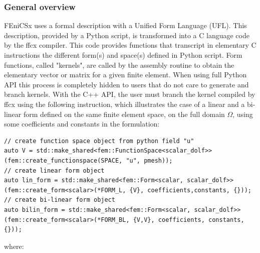 \documentclass[12pt]{article}
\newcommand{\f}[1]{FEniCSx#1}
\begin{document}
\subsubsection{General overview\label{gen_over}}
\f{} uses a formal description with a Unified Form Language (UFL). This description, provided by a Python script, is transformed into a C language code by the ffcx compiler. This code provides functions that transcript in elementary C instructions  the different form(s) and space(s) defined in Python script. Form functions, called "kernels",  are called by the assembly routine to obtain the elementary vector or matrix for a given finite element. When using full Python API this process is completely hidden to users that do not care to generate and branch kernels. With the C++ API, the user must branch the kernel compiled by ffcx using the following instruction, which illustrates the case of a linear and a bi-linear form defined on the same finite element space, on the full domain $\Omega$, using some coefficients and constants in the formulation:
\begin{lstlisting}[numbers=none,basicstyle=\scriptsize,label=generalfenicsxform]
// create function space object from python field "u"
auto V = std::make_shared<fem::FunctionSpace<scalar_dolf>>(fem::create_functionspace(SPACE, "u", pmesh));
// create linear form object
auto lin_form = std::make_shared<fem::Form<scalar, scalar_dolf>>(fem::create_form<scalar>(*FORM_L, {V}, coefficients,constants, {}));
// create bi-linear form object
auto bilin_form = std::make_shared<fem::Form<scalar, scalar_dolf>>(fem::create_form<scalar>(*FORM_BL, {V,V}, coefficients, constants, {}));
\end{lstlisting}
where:
\end{document}
